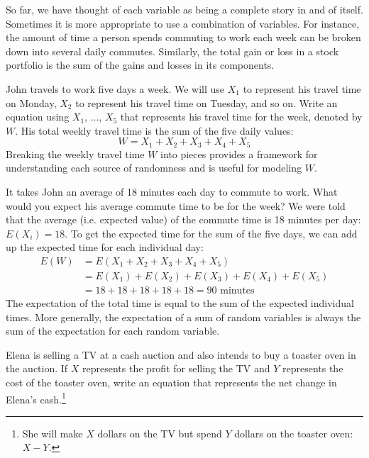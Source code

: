 So far, we have thought of each variable as being a complete story in and of itself. Sometimes it is more appropriate to use a combination of variables. For instance, the amount of time a person spends commuting to work each week can be broken down into several daily commutes. Similarly, the total gain or loss in a stock portfolio is the sum of the gains and losses in its components.

\begin{example}{John travels to work five days a week. We will use $X_1$ to represent his travel time on Monday, $X_2$ to represent his travel time on Tuesday, and so on. Write an equation using $X_1$, ..., $X_5$ that represents his travel time for the week, denoted by $W$.}
His total weekly travel time is the sum of the five daily values:
$$ W = X_1 + X_2 + X_3 + X_4 + X_5 $$
Breaking the weekly travel time $W$ into pieces provides a framework for understanding each source of randomness and is useful for modeling $W$.
\end{example}

\begin{example}{It takes John an average of 18 minutes each day to commute to work. What would you expect his average commute time to be for the week?}
We were told that the average (i.e. expected value) of the commute time is 18 minutes per day: $E(X_i) = 18$. To get the expected time for the sum of the five days, we can add up the expected time for each individual day:
\begin{align*}
E(W) &= E(X_1 + X_2 + X_3 + X_4 + X_5) \\
	&= E(X_1) + E(X_2) + E(X_3) + E(X_4) + E(X_5) \\
	&= 18 + 18 + 18 + 18 + 18 = 90\text{ minutes}
\end{align*}
The expectation of the total time is equal to the sum of the expected individual times. More generally, the expectation of a sum of random variables is always the sum of the expectation for each random variable.
\end{example}

\begin{exercise} \label{elenaIsSellingATVAndBuyingAToasterOvenAtAnAuction}
Elena is selling a TV at a cash auction and also intends to buy a toaster oven in the auction. If $X$ represents the profit for selling the TV and $Y$ represents the cost of the toaster oven, write an equation that represents the net change in Elena's cash.\footnote{She will make $X$ dollars on the TV but spend $Y$ dollars on the toaster oven: $X-Y$.}
\end{exercise}

